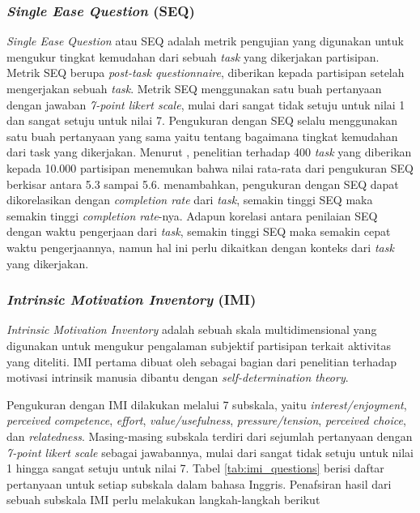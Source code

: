 \subsubsection{\textit{Single Ease Question} (SEQ)}
\label{subsubsec:seq}
\textit{Single Ease Question} atau SEQ adalah metrik pengujian yang digunakan untuk mengukur tingkat kemudahan dari sebuah \textit{task} yang dikerjakan partisipan. Metrik SEQ berupa \textit{post-task questionnaire}, diberikan kepada partisipan setelah mengerjakan sebuah \textit{task}. Metrik SEQ menggunakan satu buah pertanyaan dengan jawaban \textit{7-point likert scale}, mulai dari sangat tidak setuju untuk nilai 1 dan sangat setuju untuk nilai 7. Pengukuran dengan SEQ selalu menggunakan satu buah pertanyaan yang sama yaitu tentang bagaimana tingkat kemudahan dari task yang dikerjakan. Menurut \textcite{seq2012sauro}, penelitian terhadap 400 \textit{task} yang diberikan kepada 10.000 partisipan menemukan bahwa nilai rata-rata dari pengukuran SEQ berkisar antara 5.3 sampai 5.6. \textcite{seq2018sauro} menambahkan, pengukuran dengan SEQ dapat dikorelasikan dengan \textit{completion rate} dari \textit{task}, semakin tinggi SEQ maka semakin tinggi \textit{completion rate}-nya. Adapun korelasi antara penilaian SEQ dengan waktu pengerjaan dari \textit{task}, semakin tinggi SEQ maka semakin cepat waktu pengerjaannya, namun hal ini perlu dikaitkan dengan konteks dari \textit{task} yang dikerjakan.

\subsubsection{\textit{Intrinsic Motivation Inventory} (IMI)}
\label{subsubsec:imi}
\textit{Intrinsic Motivation Inventory} adalah sebuah skala multidimensional yang digunakan untuk mengukur pengalaman subjektif partisipan terkait aktivitas yang diteliti. \parencite{imisdtorg} IMI pertama dibuat oleh \textcite{RYANDECI2000SDT} sebagai bagian dari penelitian terhadap motivasi intrinsik manusia dibantu dengan \textit{self-determination theory}.

Pengukuran dengan IMI dilakukan melalui 7 subskala, yaitu \textit{interest/enjoyment}, \textit{perceived competence}, \textit{effort}, \textit{value/usefulness}, \textit{pressure/tension}, \textit{perceived choice}, dan \textit{relatedness}. Masing-masing subskala terdiri dari sejumlah pertanyaan dengan \textit{7-point likert scale} sebagai jawabannya, mulai dari sangat tidak setuju untuk nilai 1 hingga sangat setuju untuk nilai 7. Tabel \ref{tab:imi_questions} berisi daftar pertanyaan untuk setiap subskala dalam bahasa Inggris. Penafsiran hasil dari sebuah subskala IMI perlu melakukan langkah-langkah berikut

